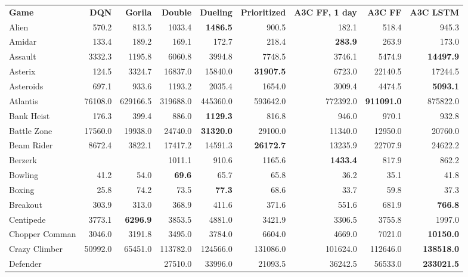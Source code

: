\documentclass{article} \usepackage{times}
\begin{document}
\begin{table*}[h]
    \centering
    \begin{scriptsize}
    \begin{tabular}{lrrrrrrrr}
        \textbf{Game} & \textbf{DQN} & \textbf{Gorila} & \textbf{Double} & \textbf{Dueling} & \textbf{Prioritized} & \textbf{A3C FF, 1 day} & \textbf{A3C FF } & \textbf{A3C LSTM } \\
Alien & 570.2 & 813.5 & 1033.4 & \textbf{1486.5} & 900.5 & 182.1 & 518.4 & 945.3\\
Amidar & 133.4 & 189.2 & 169.1 & 172.7 & 218.4 & \textbf{283.9} & 263.9 & 173.0\\
Assault & 3332.3 & 1195.8 & 6060.8 & 3994.8 & 7748.5 & 3746.1 & 5474.9 & \textbf{14497.9}\\
Asterix & 124.5 & 3324.7 & 16837.0 & 15840.0 & \textbf{31907.5} & 6723.0 & 22140.5 & 17244.5\\
Asteroids & 697.1 & 933.6 & 1193.2 & 2035.4 & 1654.0 & 3009.4 & 4474.5 & \textbf{5093.1}\\
Atlantis & 76108.0 & 629166.5 & 319688.0 & 445360.0 & 593642.0 & 772392.0 & \textbf{911091.0} & 875822.0\\
Bank Heist & 176.3 & 399.4 & 886.0 & \textbf{1129.3} & 816.8 & 946.0 & 970.1 & 932.8\\
Battle Zone & 17560.0 & 19938.0 & 24740.0 & \textbf{31320.0} & 29100.0 & 11340.0 & 12950.0 & 20760.0\\
Beam Rider & 8672.4 & 3822.1 & 17417.2 & 14591.3 & \textbf{26172.7} & 13235.9 & 22707.9 & 24622.2\\
Berzerk &  &  & 1011.1 & 910.6 & 1165.6 & \textbf{1433.4} & 817.9 & 862.2\\
Bowling & 41.2 & 54.0 & \textbf{69.6} & 65.7 & 65.8 & 36.2 & 35.1 & 41.8\\
Boxing & 25.8 & 74.2 & 73.5 & \textbf{77.3} & 68.6 & 33.7 & 59.8 & 37.3\\
Breakout & 303.9 & 313.0 & 368.9 & 411.6 & 371.6 & 551.6 & 681.9 & \textbf{766.8}\\
Centipede & 3773.1 & \textbf{6296.9} & 3853.5 & 4881.0 & 3421.9 & 3306.5 & 3755.8 & 1997.0\\
Chopper Comman & 3046.0 & 3191.8 & 3495.0 & 3784.0 & 6604.0 & 4669.0 & 7021.0 & \textbf{10150.0}\\
Crazy Climber & 50992.0 & 65451.0 & 113782.0 & 124566.0 & 131086.0 & 101624.0 & 112646.0 & \textbf{138518.0}\\
Defender &  &  & 27510.0 & 33996.0 & 21093.5 & 36242.5 & 56533.0 & \textbf{233021.5}\\

\end{tabular}
\end{scriptsize}
\end{table*}
\end{document}
